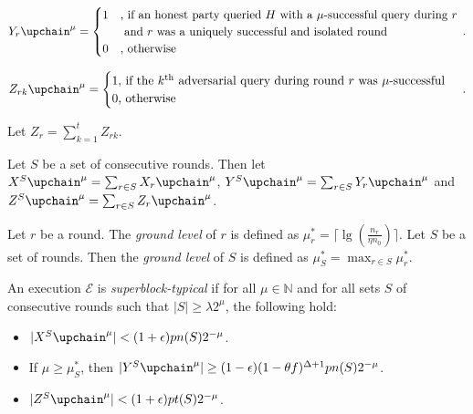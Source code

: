 \begin{align*}
Y_r\upchain^\mu = \begin{cases}
  1&\text{, if an honest party queried $H$ with a $\mu$-successful query during $r$}
   \\
   &\text{  and $r$ was a uniquely successful and isolated round}
    \\
  0&\text{, otherwise}
\end{cases}\,.
\end{align*}

\begin{align*}
Z_{r k}\upchain^\mu = \begin{cases}
  1\text{, if the } k^\text{th} \text{ adversarial query during round $r$
           was $\mu$-successful}\\
  0\text{, otherwise}
\end{cases}\,.
\end{align*}

Let $Z_r = \sum_{k = 1}^t Z_{r k}$.

Let $S$ be a set of consecutive rounds. Then let
$X^S\upchain^\mu = \sum_{r \in S}X_r\upchain^\mu$,
$Y^S\upchain^\mu = \sum_{r \in S}Y_r\upchain^\mu$ and
$Z^S\upchain^\mu = \sum_{r \in S}Z_r\upchain^\mu$.

\begin{definition}
  Let $r$ be a round. The \emph{ground level} of $r$ is defined as
  $\mu^*_r = \lceil\lg(\frac{n_r}{\eta n_0})\rceil$. Let $S$ be a set of rounds.
  Then the \emph{ground level} of $S$ is defined as
  $\mu^*_S = \max_{r \in S}\mu^*_r$.
\end{definition}

\begin{definition}
  An execution $\mathcal{E}$ is \emph{superblock-typical} if
  for all $\mu \in \mathbb{N}$ and
  for all sets $S$ of consecutive rounds such that $|S| \geq \lambda 2^\mu$,
  the following hold:

  \begin{itemize}
    \item $|X^S\upchain^\mu| < (1 + \epsilon) p n(S) 2^{-\mu}   $.
    \item If $\mu \geq \mu^*_S$, then $|Y^S\upchain^\mu| \geq (1 - \epsilon)  (1-\theta f)^{\Delta+1} p n(S) 2^{-\mu}  $.
    \item $|Z^S\upchain^\mu| < (1 + \epsilon)  p t(S) 2^{-\mu}   $.
  \end{itemize}
\end{definition}

